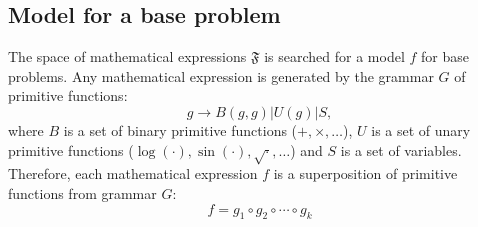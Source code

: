 \documentclass[12pt]{article}
\begin{document}
\subsection{Model for a base problem}
The space of mathematical expressions $\mathfrak{F}$ is searched for a model $f$ for base problems.
Any mathematical expression is generated by the grammar $G$ of primitive functions:
\begin{equation}
  g \rightarrow B(g, g)|U(g)|S,
\end{equation}
where $B$ is a set of binary primitive functions ($+, \times, \dots$), $U$ is a set of unary primitive functions ($\log(\cdot), \sin(\cdot), \sqrt{\cdot}, \dots$) and $S$ is a set of variables.
Therefore, each mathematical expression $f$ is a superposition of primitive functions from grammar $G$:
\begin{equation}
  f = g_1 \circ g_2 \circ \cdots \circ g_k
\end{equation}
\end{document}
